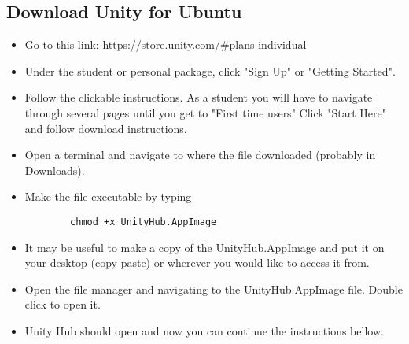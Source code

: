 \documentclass[11pt,fleqn,openany]{book} %
\begin{document}
\subsection{Download Unity for Ubuntu}
\begin{itemize}
    \item Go to this link: \href{https://store.unity.com/#plans-individual}{https://store.unity.com/#plans-individual}
    \item Under the student or personal package, click "Sign Up" or "Getting Started".
    \item Follow the clickable instructions. As a student you will have to navigate through several pages until you get to "First time users" Click "Start Here" and follow download instructions.
    \item Open a terminal and navigate to where the file downloaded (probably in Downloads).
    \item Make the file executable by typing \begin{verbatim}
        chmod +x UnityHub.AppImage
    \end{verbatim}
    \item It may be useful to make a copy of the UnityHub.AppImage and put it on your desktop (copy paste) or wherever you would like to access it from.
    \item Open the file manager and navigating to the UnityHub.AppImage file. Double click to open it.
    \item Unity Hub should open and now you can continue the instructions bellow.
\end{itemize}
\end{document}
